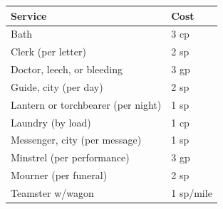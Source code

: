 \begin{multicols}{2}
\begin{minipage}{\columnwidth}
\end{minipage}

\noindent
\begin{minipage}{\columnwidth}

\label{livingconditions}
\noindent
\begin{tabular}{|p{}|p{}|}
\hline
Service						& Cost \\
\hline\hline
\rowcolor[gray]{.9}Bath						& 3 cp \\
Clerk (per letter)			& 2 sp \\
\rowcolor[gray]{.9}Doctor, leech, or bleeding	& 3 gp \\
Guide, city (per day)		& 2 sp \\
\rowcolor[gray]{.9}Lantern or torchbearer (per night)	& 1 sp \\
Laundry (by load)			& 1 cp \\
\rowcolor[gray]{.9}Messenger, city (per message)	& 1 sp \\
Minstrel (per performance)	& 3 gp \\
\rowcolor[gray]{.9}Mourner (per funeral)		& 2 sp \\
Teamster w/wagon			& 1 sp/mile \\
\hline
\end{tabular}

\end{minipage}

\noindent
\begin{minipage}{\columnwidth}


\end{minipage}
\end{multicols}
